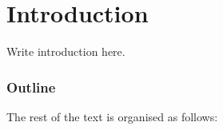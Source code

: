 \chapter{Introduction}


Write introduction here.


\subsection{Outline}

The rest of the text is organised as follows: